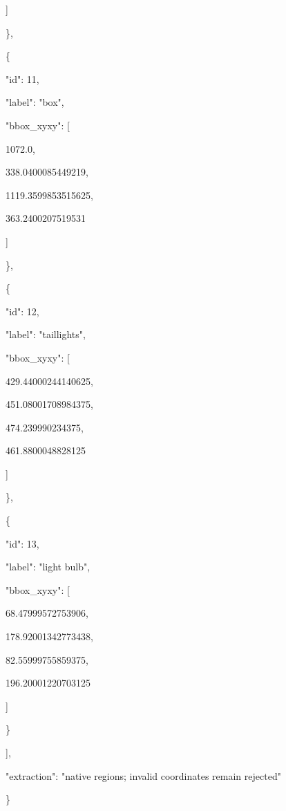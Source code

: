 \documentclass[10pt,a4paper]{article}
\begin{document}
      ]\par
    \},\allowbreak{}\par
    \{\par
      "id":\allowbreak{} 11,\allowbreak{}\par
      "label":\allowbreak{} "box",\allowbreak{}\par
      "bbox\_xyxy":\allowbreak{} [\par
        1072.0,\allowbreak{}\par
        338.0400085449219,\allowbreak{}\par
        1119.3599853515625,\allowbreak{}\par
        363.2400207519531\par
      ]\par
    \},\allowbreak{}\par
    \{\par
      "id":\allowbreak{} 12,\allowbreak{}\par
      "label":\allowbreak{} "taillights",\allowbreak{}\par
      "bbox\_xyxy":\allowbreak{} [\par
        429.44000244140625,\allowbreak{}\par
        451.08001708984375,\allowbreak{}\par
        474.239990234375,\allowbreak{}\par
        461.8800048828125\par
      ]\par
    \},\allowbreak{}\par
    \{\par
      "id":\allowbreak{} 13,\allowbreak{}\par
      "label":\allowbreak{} "light bulb",\allowbreak{}\par
      "bbox\_xyxy":\allowbreak{} [\par
        68.47999572753906,\allowbreak{}\par
        178.92001342773438,\allowbreak{}\par
        82.55999755859375,\allowbreak{}\par
        196.20001220703125\par
      ]\par
    \}\par
  ],\allowbreak{}\par
  "extraction":\allowbreak{} "native regions; invalid coordinates remain rejected"\par
\}
\end{document}
